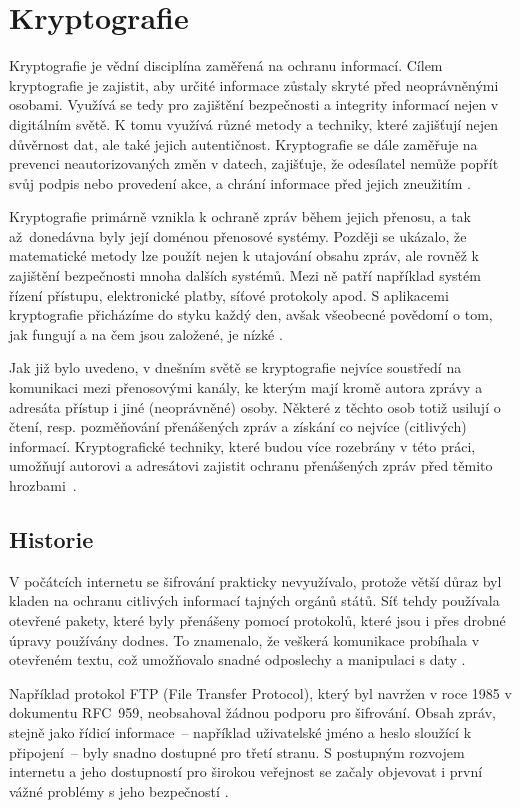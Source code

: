 \section{Kryptografie}
Kryptografie je vědní disciplína zaměřená na ochranu informací. Cílem kryptografie je zajistit, aby určité informace zůstaly skryté před neoprávněnými osobami. Využívá se tedy pro zajištění bezpečnosti a integrity informací nejen v digitálním světě. K tomu využívá různé metody a techniky, které zajišťují nejen důvěrnost dat, ale také jejich autentičnost. Kryptografie se dále zaměřuje na prevenci neautorizovaných změn v datech, zajišťuje, že odesílatel nemůže popřít svůj podpis nebo provedení akce, a chrání informace před jejich zneužitím \parencite{tesar2021}.

Kryptografie primárně vznikla k ochraně zpráv během jejich přenosu, a tak až~donedávna byly její doménou přenosové systémy. Později se ukázalo, že matematické metody lze použít nejen k utajování obsahu zpráv, ale rovněž k zajištění bezpečnosti mnoha dalších systémů. Mezi ně patří například systém řízení přístupu, elektronické platby, síťové protokoly apod. S aplikacemi kryptografie přicházíme do styku každý den, avšak všeobecné povědomí o tom, jak fungují a na čem jsou založené, je nízké \parencite{burda2019}.

Jak již bylo uvedeno, v dnešním světě se kryptografie nejvíce soustředí na komunikaci mezi přenosovými kanály, ke kterým mají kromě autora zprávy a adresáta přístup i jiné (neoprávněné) osoby. Některé z těchto osob totiž usilují o čtení, resp. pozměňování přenášených zpráv a získání co nejvíce (citlivých) informací. Kryptografické techniky, které budou více rozebrány v této práci, umožňují autorovi a adresátovi zajistit ochranu přenášených zpráv před těmito hrozbami~\mbox{\parencite{sedlak2021}.}

\subsection{Historie}

V počátcích internetu se šifrování prakticky nevyužívalo, protože větší důraz byl kladen na ochranu citlivých informací tajných orgánů států. Síť tehdy používala otevřené pakety, které byly přenášeny pomocí protokolů, které jsou i přes drobné úpravy používány dodnes. To znamenalo, že veškerá komunikace probíhala v otevřeném textu, což umožňovalo snadné odposlechy a manipulaci s daty \mbox{\parencite{erben2014}.}

Například protokol FTP (File Transfer Protocol), který byl navržen v roce 1985 v dokumentu RFC~959, neobsahoval žádnou podporu pro šifrování. Obsah zpráv, stejně jako řídicí informace~--  například uživatelské jméno a heslo sloužící k připojení~-- byly snadno dostupné pro třetí stranu. S postupným rozvojem internetu a jeho dostupností pro širokou veřejnost se začaly objevovat i první vážné problémy s jeho bezpečností \parencite{cerna2012}.

